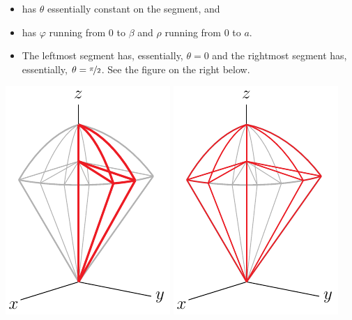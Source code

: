 \begin{eg}
\begin{itemize}
\begin{itemize} \itemsep1pt \parskip0pt 
\item
has $\theta$ essentially constant on the segment, and 
\item
has $\varphi$ running from $0$ to $\beta$ and $\rho$ running from $0$
to $a$.
\item 
The leftmost segment has, essentially, $\theta=0$ and the rightmost segment has, essentially, $\theta=\nicefrac{\pi}{2}$. See the figure on the 
right below.
\end{itemize}
\begin{efig}
\begin{center}
    \includegraphics{iceCream1.pdf}\qquad
    \includegraphics{iceCream1a.pdf}
\end{center}
\end{efig}
\vspace{-\topsep}


\end{itemize}
\end{eg}
